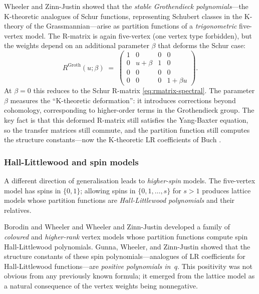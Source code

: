 Wheeler and Zinn-Justin \cite{wheeler-zinn-justin-2016} showed that
the \emph{stable Grothendieck polynomials}---the K-theoretic
analogues of Schur functions, representing Schubert classes in the
K-theory of the Grassmannian---arise as partition functions of a
\emph{trigonometric} five-vertex model.  The R-matrix is again
five-vertex (one vertex type forbidden), but the weights depend on an
additional parameter $\beta$ that deforms the Schur case:
\[
  R^{\mathrm{Groth}}(u; \beta) \;=\;
  \begin{pmatrix}
    1 & 0 & 0 & 0 \\
    0 & u + \beta & 1 & 0 \\
    0 & 0 & 0 & 0 \\
    0 & 0 & 0 & 1+\beta u
  \end{pmatrix}.
\]
At $\beta = 0$ this reduces to the Schur R-matrix
\eqref{eq:rmatrix-spectral}.  The parameter $\beta$ measures the
``K-theoretic deformation'': it introduces corrections beyond
cohomology, corresponding to higher-order terms in the Grothendieck
group.  The key fact is that this deformed R-matrix still satisfies
the Yang-Baxter equation, so the transfer matrices still commute, and
the partition function still computes the structure constants---now
the K-theoretic LR coefficients of Buch
\cite{buch-2002}.

\subsubsection*{Hall-Littlewood and spin models}

A different direction of generalisation leads to
\emph{higher-spin} models.  The five-vertex model has spins in
$\{0, 1\}$; allowing spins in $\{0, 1, \ldots, s\}$ for $s > 1$
produces lattice models whose partition functions are
\emph{Hall-Littlewood polynomials} and their relatives.

Borodin and Wheeler \cite{borodin-wheeler-2018} and
Wheeler and Zinn-Justin \cite{wheeler-zinn-justin-2025}
developed a family of \emph{coloured} and
\emph{higher-rank} vertex models whose partition functions compute
spin Hall-Littlewood polynomials.  Gunna, Wheeler, and Zinn-Justin
\cite{gunna-wheeler-zj-2025} showed that the structure constants of
these spin polynomials---analogues of LR coefficients for
Hall-Littlewood functions---are \emph{positive polynomials in~$q$}.
This positivity was not obvious from any previously known formula; it
emerged from the lattice model as a natural consequence of the vertex
weights being nonneg\-ative.

